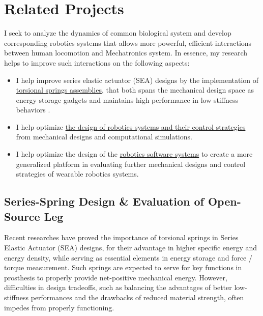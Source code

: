 \documentclass[8pt]{article}
\begin{document}

 

% 

\section{Related Projects}

I seek to analyze the dynamics of common biological system and develop corresponding robotics systems that allows more powerful, efficient interactions between human locomotion and Mechatronics system. In essence, my research helps to improve such interactions on the following aspects: 

\begin{itemize}

    \item {I help improve series elastic actuator (SEA) designs by the implementation of \hyperref[sec:series-spring]{torsional springs assemblies}, that both spans the mechanical design space as energy storage gadgets and maintains high performance in low stiffness behaviors \cite{SpringDesign_OSL}.}
    
    \item {I help optimize \hyperref[sec:RobotSwimmer]{the design of robotics systems and their control strategies} from mechanical designs and computational simulations.}
    
    \item {I help optimize the design of the \hyperref[sec:OSL-Library]{robotics software systems} to create a more generalized platform in evaluating further mechanical designs and control strategies of wearable robotics systems.}

\end{itemize}


    \subsection{Series-Spring Design \& Evaluation of Open-Source Leg}  \label{sec:series-spring}

    Recent researches have proved the importance of torsional springs in Series Elastic Actuator (SEA) designs, for their advantage in higher specific energy and energy density, while serving as essential elements in energy storage and force / torque measurement. Such springs are expected to serve for key functions in prosthesis to properly provide net-positive mechanical energy. However, difficulties in design tradeoffs, such as balancing the advantages of better low-stiffness performances and the drawbacks of reduced material strength, often impedes from properly functioning. 
\end{document}
